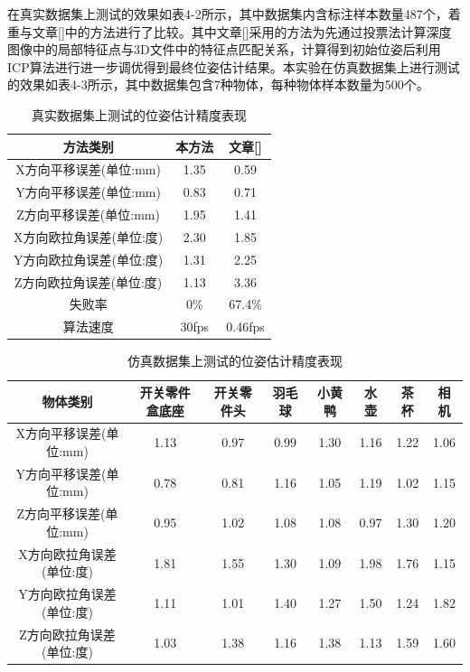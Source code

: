 在真实数据集上测试的效果如表4-2所示，其中数据集内含标注样本数量487个，着重与文章[]中的方法进行了比较。其中文章[]采用的方法为先通过投票法计算深度图像中的局部特征点与3D文件中的特征点匹配关系，计算得到初始位姿后利用ICP算法进行进一步调优得到最终位姿估计结果。本实验在仿真数据集上进行测试的效果如表4-3所示，其中数据集包含7种物体，每种物体样本数量为500个。
\begin{table}[htb]
	\caption{真实数据集上测试的位姿估计精度表现} 
	\centering 
	\begin{tabular}[t]{
		ccc} 
		\toprule
		方法类别 & 本方法 & 文章[\citenum{drost2010model}]\\ 
		\midrule
		X方向平移误差(单位:mm) & 1.35 & 0.59\\
		Y方向平移误差(单位:mm) & 0.83 & 0.71\\
		Z方向平移误差(单位:mm) & 1.95 & 1.41\\
		X方向欧拉角误差(单位:度) & 2.30 & 1.85\\
		Y方向欧拉角误差(单位:度) & 1.31 & 2.25\\
		Z方向欧拉角误差(单位:度) & 1.13 & 3.36\\
		\midrule
		失败率 & 0\% & 67.4\% \\
		\midrule
		算法速度 & 30fps & 0.46fps \\
		\bottomrule
	\end{tabular}
\end{table}

\begin{table}[htb]
	\caption{仿真数据集上测试的位姿估计精度表现} 
	\centering 
	\begin{tabular}[t]{
		cccccccc} 
		\toprule
		物体类别 & 开关零件盒底座 & 开关零件头 & 羽毛球 & 小黄鸭 & 水壶 & 茶杯 & 相机\\ 
		\midrule
		X方向平移误差(单位:mm) & 1.13 & 0.97 & 0.99& 1.30& 1.16&1.22 &1.06 \\
		Y方向平移误差(单位:mm) & 0.78 & 0.81 & 1.16&1.05 &1.19 &1.02 &1.15 \\
		Z方向平移误差(单位:mm) & 0.95 & 1.02 & 1.08& 1.08& 0.97& 1.30&1.20 \\
		X方向欧拉角误差(单位:度) & 1.81 & 1.55 &1.30 &1.09 &1.98 &1.76 &1.15 \\
		Y方向欧拉角误差(单位:度) & 1.11 & 1.01 &1.40 &1.27 &1.50 &1.24 &1.82 \\
		Z方向欧拉角误差(单位:度) & 1.03 & 1.38 &1.16 &1.38 &1.13 &1.59 &1.60 \\
		\bottomrule
	\end{tabular}
\end{table}

